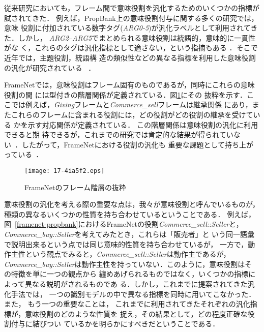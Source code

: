 \documentclass[japanese]{jnlp_1.4}
\begin{document}
従来研究においても，フレーム間で意味役割を汎化するためのいくつかの指標が
試されてきた．
例えば，PropBank上の意味役割付与に関する多くの研究では，意味
役割に付加されている数字タグ({\it ARG0-5})が汎化ラベルとして利用されてき
た．しかし，
{\it ARG2}--{\it ARG5}でまとめられる意味役割は統語的，意味的に一貫性がな
く，これらのタグは汎化指標として適さない，という指摘もある
．そこで近年では，主題役割，統語構
造の類似性などの異なる指標を利用した意味役割の汎化が研究されている
~．


FrameNetでは，意味役割はフレーム固有のものであるが，同時にこれらの意味役割の間
には型付きの階層関係が定義されている．図\ref{fig:frame-hierarchy}にその
抜粋を示す．こ
こでは例えば，{\it Giving}フレームと{\it Commerce\_sell}フレームは継承関係
にあり，またこれらのフレームに含まれる役割には，どの役割がどの役割の継承を受けている
かを示す対応関係が定義されている．
この階層関係は意味役割の汎化に利用できると期
待できるが，これまでの研究では肯定的な結果が得られていな
い~．したがって，FrameNetにおける役割の汎化も
重要な課題として持ち上がっている~．

\begin{figure}[b]
\begin{center}
\texttt{[image: 17-4ia5f2.eps]}
\caption{FrameNetのフレーム階層の抜粋}
\label{fig:frame-hierarchy}
\end{center}
\end{figure}

意味役割の汎化を考える際の重要な点は，我々が意味役割と呼んでいるものが，
種類の異なるいくつかの性質を持ち合わせているということである．
例えば，図~\ref{framenet-propbank}におけるFrameNetの役割{\it Commerce\_sell::Seller}と，
{\it Commerce\_buy::Seller}を考えてみたとき，これらは「販売者」と
いう同一語彙で説明出来るという点では同じ意味的性質を持ち合わせているが，
一方で，動作主性という観点でみると，{\it Commerce\_sell::Seller}は動作主であるが，
{\it Commerce\_buy::Seller}は動作主性を持っていない．このように，意味役割はそ
の特徴を単に一つの観点から
纏めあげられるものではなく，いくつかの指標によって異なる説明がされるものであ
る．しかし，これまでに提案されてきた汎化手法では，
一つの識別モデルの中で異なる指標を同時に用いてこなかった．
また，
もう一つの重要なことは，
これまでに利用されてきたそれぞれの汎化指標が，意味役割のどのような性質を
捉え，その結果として，どの程度正確な役割付与に結びつい
ているかを明らかにすべきだということである．
\end{document}
